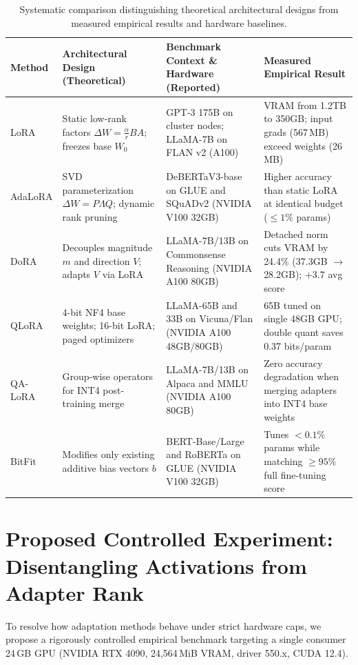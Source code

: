 \documentclass[11pt,a4paper]{article}
\begin{document}
\begin{table}[ht]
\centering
\small
\caption{Systematic comparison distinguishing theoretical architectural designs from measured empirical results and hardware baselines.}
\label{tab:comparison}
\begin{tabularx}{\textwidth}{lL{2.5cm}L{3.2cm}Y}
\toprule
\textbf{Method} & \textbf{Architectural Design (Theoretical)} & \textbf{Benchmark Context \& Hardware (Reported)} & \textbf{Measured Empirical Result} \\
\midrule
LoRA & Static low-rank factors $\Delta W = \frac{\alpha}{r}BA$; freezes base $W_0$ & GPT-3 175B on cluster nodes; LLaMA-7B on FLAN v2 (A100) & VRAM from 1.2TB to 350GB; input grads (567\,MB) exceed weights (26\,MB) \\
AdaLoRA & SVD parameterization $\Delta W = P \Lambda Q$; dynamic rank pruning & DeBERTaV3-base on GLUE and SQuADv2 (NVIDIA V100 32GB) & Higher accuracy than static LoRA at identical budget ($\le 1\%$ params) \\
DoRA & Decouples magnitude $m$ and direction $V$; adapts $V$ via LoRA & LLaMA-7B/13B on Commonsense Reasoning (NVIDIA A100 80GB) & Detached norm cuts VRAM by 24.4\% (37.3GB $\to$ 28.2GB); $+3.7$ avg score \\
QLoRA & 4-bit NF4 base weights; 16-bit LoRA; paged optimizers & LLaMA-65B and 33B on Vicuna/Flan (NVIDIA A100 48GB/80GB) & 65B tuned on single 48GB GPU; double quant saves 0.37 bits/param \\
QA-LoRA & Group-wise operators for INT4 post-training merge & LLaMA-7B/13B on Alpaca and MMLU (NVIDIA A100 80GB) & Zero accuracy degradation when merging adapters into INT4 base weights \\
BitFit & Modifies only existing additive bias vectors $b$ & BERT-Base/Large and RoBERTa on GLUE (NVIDIA V100 32GB) & Tunes $<0.1\%$ params while matching $\ge 95\%$ full fine-tuning score \\
\bottomrule
\end{tabularx}
\end{table}

\section{Proposed Controlled Experiment: Disentangling Activations from Adapter Rank}

To resolve how adaptation methods behave under strict hardware caps, we propose a rigorously controlled empirical benchmark targeting a single consumer 24\,GB GPU (NVIDIA RTX 4090, 24,564\,MiB VRAM, driver 550.x, CUDA 12.4).
\end{document}
